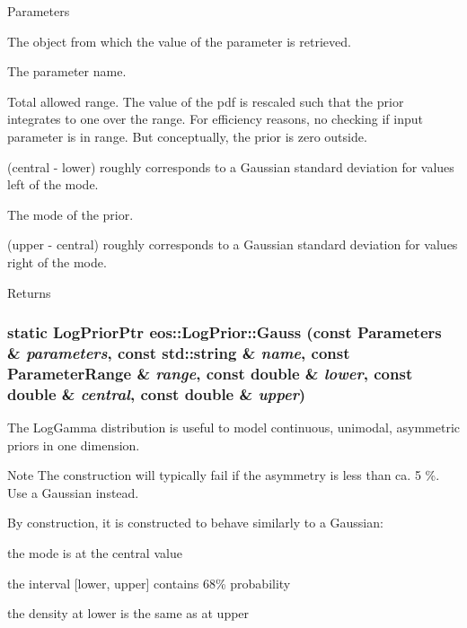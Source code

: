 \begin{DoxyParams}{Parameters}
\item[{\em parameters}]The object from which the value of the parameter is retrieved. \item[{\em name}]The parameter name. \item[{\em range}]Total allowed range. The value of the pdf is rescaled such that the prior integrates to one over the range. For efficiency reasons, no checking if input parameter is in range. But conceptually, the prior is zero outside. \item[{\em lower}](central -\/ lower) roughly corresponds to a Gaussian standard deviation for values left of the mode. \item[{\em central}]The mode of the prior. \item[{\em upper}](upper -\/ central) roughly corresponds to a Gaussian standard deviation for values right of the mode. \end{DoxyParams}
\begin{DoxyReturn}{Returns}

\end{DoxyReturn}
\hypertarget{classeos_1_1LogPrior_afe99a1c56a9ef60b4c38fe56f3c2b7ae}{
\subsubsection[{Gauss}]{\setlength{\rightskip}{0pt plus 5cm}static {\bf LogPriorPtr} eos::LogPrior::Gauss (const {\bf Parameters} \& {\em parameters}, \/  const std::string \& {\em name}, \/  const {\bf ParameterRange} \& {\em range}, \/  const double \& {\em lower}, \/  const double \& {\em central}, \/  const double \& {\em upper})}}
\label{classeos_1_1LogPrior_afe99a1c56a9ef60b4c38fe56f3c2b7ae}
The LogGamma distribution is useful to model continuous, unimodal, asymmetric priors in one dimension.

\begin{DoxyNote}{Note}
The construction will typically fail if the asymmetry is less than ca. 5 \%. Use a Gaussian instead.
\end{DoxyNote}
By construction, it is constructed to behave similarly to a Gaussian:
\begin{DoxyItemize}
\item the mode is at the central value
\item the interval \mbox{[}lower, upper\mbox{]} contains 68\% probability
\item the density at lower is the same as at upper
\end{DoxyItemize}


